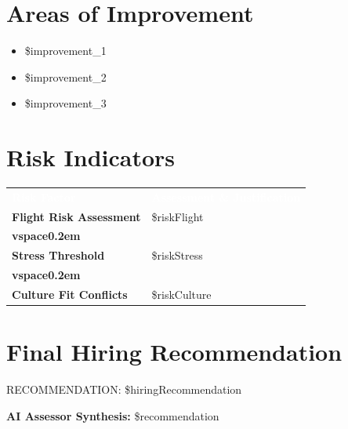 \documentclass[11pt,a4paper]{article}
\begin{document}
\section{Areas of Improvement}
\begin{tcolorbox}[colframe=WiseBorder, colback=white, boxrule=0.5pt, arc=3pt, left=5pt]
\begin{itemize}[leftmargin=1.5em, itemsep=0.4em, label=\textcolor{WiseGray}{\(\bullet\)}]
  \item \${improvement\_1}
  \item \${improvement\_2}
  \item \${improvement\_3}
\end{itemize}
\end{tcolorbox}

\section{Risk Indicators}
\renewcommand{\arraystretch}{1.5}
\begin{tabularx}{\textwidth}{@{} >{\bfseries}p{4cm} X @{}}
  \rowcolor{WiseThemeBg}
  \textcolor{white}{\textbf{Risk Factor}} & \textcolor{white}{\textbf{Assessment \& Justification}} \\
  \rowcolor{WiseLight}
  Flight Risk Assessment & \${riskFlight}\\vspace{0.2em} \\
  Stress Threshold & \${riskStress}\\vspace{0.2em} \\
  \rowcolor{WiseLight}
  Culture Fit Conflicts & \${riskCulture} \\
  \bottomrule
\end{tabularx}

\section{Final Hiring Recommendation}
\begin{tcolorbox}[colframe=WiseThemeBg, colback=WiseThemeBg, coltext=white, fontupper=\large\bfseries, center, boxrule=0pt, arc=4pt, toptitle=1.5ex, bottomtitle=1.5ex]
  RECOMMENDATION: \${hiringRecommendation}
\end{tcolorbox}
\vspace{0.2em}
\noindent
\textbf{AI Assessor Synthesis:} \${recommendation}
\end{document}
